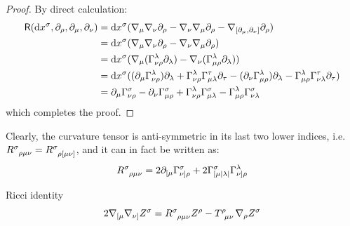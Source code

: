 \begin{proofbox}
  \begin{proof}
    By direct calculation:
    \begin{equation*}
      \begin{split}
        \textsf{R}(\mathrm{d} x^\sigma, \partial_\rho, \partial_\mu, \partial_\nu)
        &= \mathrm{d} x^\sigma (\nabla_\mu \nabla_\nu \partial_\rho - \nabla_\nu \nabla_\mu \partial_\rho - \nabla_{[\partial_\mu, \partial_\nu]} \partial_\rho) \\
        &= \mathrm{d} x^\sigma (\nabla_\mu \nabla_\nu \partial_\rho - \nabla_\nu \nabla_\mu \partial_\rho) \\
        &= \mathrm{d} x^\sigma (\nabla_\mu (\Gamma^\lambda_{\nu \rho} \partial_\lambda) - \nabla_\nu (\Gamma^\lambda_{\mu \rho} \partial_\lambda)) \\
        &= \mathrm{d} x^\sigma ((\partial_\mu \Gamma^\lambda_{\nu \rho}) \partial_\lambda + \Gamma^\lambda_{\nu \rho} \Gamma^\tau_{\mu \lambda} \partial_\tau - (\partial_\nu \Gamma^\lambda_{\mu \rho}) \partial_\lambda - \Gamma^\lambda_{\mu \rho} \Gamma^\tau_{\nu \lambda} \partial_{\tau}) \\
        &= \partial_\mu \Gamma^\sigma_{\nu \rho} - \partial_\nu \Gamma^\sigma_{\mu \rho} + \Gamma^\lambda_{\nu \rho} \Gamma^\sigma_{\mu \lambda} - \Gamma^\lambda_{\mu \rho} \Gamma^\sigma_{\nu \lambda}
      \end{split}
    \end{equation*}
    which completes the proof.
  \end{proof}
\end{proofbox}

Clearly, the curvature tensor is anti-symmetric in its last two lower indices, i.e. $ \tensor{R}{^\sigma _\rho _\mu _\nu} = \tensor{R}{^\sigma _\rho _[ _\mu _\nu _]} $, and it can in fact be written as:
\begin{equation}
  \tensor{R}{^\sigma _\rho _\mu _\nu} = 2 \pa_{[\mu} \Gamma^\sigma_{\nu] \rho} + 2 \Gamma^\sigma_{[\mu | \lambda |} \Gamma^\lambda_{\nu]\rho}
\end{equation}

\begin{theorem}[before upper = {\tcbtitle}]{Ricci identity}{}
  \begin{equation}
    2 \na_{[\mu} \na_{\nu]} Z^\sigma = \tensor{R}{^\sigma _\rho _\mu _\nu} Z^\rho - \tensor{T}{^\rho_{\mu \nu}} \na_\rho Z^\sigma
    \label{eq:ricci-id}
  \end{equation}
\end{theorem}

